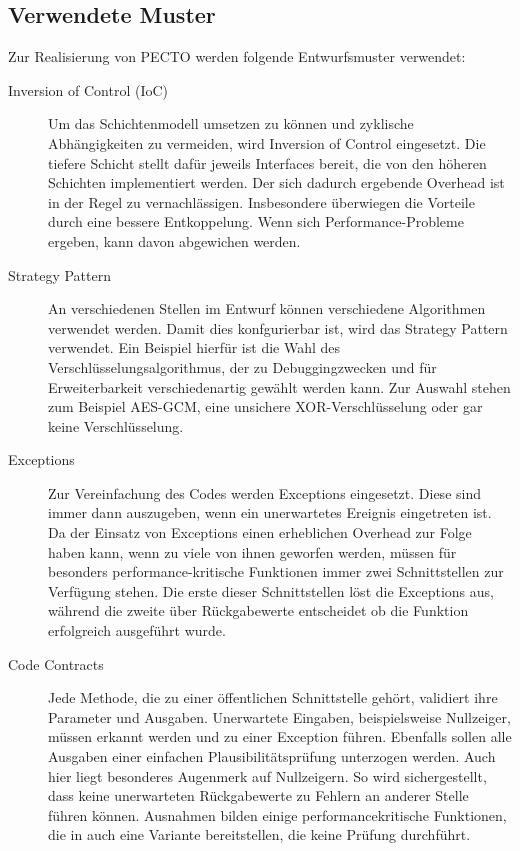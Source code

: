 \documentclass[a4paper, 11pt, ngerman, fleqn]{article}
\begin{document}
\subsection*{Verwendete Muster}
Zur Realisierung von PECTO werden folgende Entwurfsmuster verwendet:

\begin{description}
	\item[Inversion of Control (IoC)] 
	Um das Schichtenmodell umsetzen zu können und zyklische Abhängigkeiten zu vermeiden, wird Inversion of Control eingesetzt. 
	Die tiefere Schicht stellt dafür jeweils Interfaces bereit, die von den höheren Schichten implementiert werden. 
	Der sich dadurch ergebende Overhead ist in der Regel zu vernachlässigen.
	Insbesondere überwiegen die Vorteile durch eine bessere Entkoppelung.
	Wenn sich Performance-Probleme ergeben, kann davon abgewichen werden.
	
	\item[Strategy Pattern]
	An verschiedenen Stellen im Entwurf können verschiedene Algorithmen verwendet werden. 
	Damit dies konfgurierbar ist, wird das Strategy Pattern verwendet.
	Ein Beispiel hierfür ist die Wahl des Verschlüsselungsalgorithmus, der zu Debuggingzwecken und für Erweiterbarkeit verschiedenartig gewählt werden kann.
	Zur Auswahl stehen zum Beispiel AES-GCM, eine unsichere XOR-Verschlüsselung oder gar keine Verschlüsselung. 
	
	\item[Exceptions]
	Zur Vereinfachung des Codes werden Exceptions eingesetzt.
	Diese sind immer dann auszugeben, wenn ein unerwartetes Ereignis eingetreten ist.
	Da der Einsatz von Exceptions einen erheblichen Overhead zur Folge haben kann, wenn zu viele von ihnen geworfen werden, müssen für besonders performance-kritische Funktionen immer zwei Schnittstellen zur Verfügung stehen.
	Die erste dieser Schnittstellen löst die Exceptions aus, während die zweite über Rückgabewerte entscheidet ob die Funktion erfolgreich ausgeführt wurde.
	
	\item[Code Contracts]
	Jede Methode, die zu einer öffentlichen Schnittstelle gehört, validiert ihre Parameter und Ausgaben.
	Unerwartete Eingaben, beispielsweise Nullzeiger, müssen erkannt werden und zu einer Exception führen.
	Ebenfalls sollen alle Ausgaben einer einfachen Plausibilitätsprüfung unterzogen werden. 
	Auch hier liegt besonderes Augenmerk auf Nullzeigern.
	So wird sichergestellt, dass keine unerwarteten Rückgabewerte zu Fehlern an anderer Stelle führen können.
	Ausnahmen bilden einige performancekritische Funktionen, die in auch eine Variante bereitstellen, die keine Prüfung durchführt.
\end{description}
\end{document}
